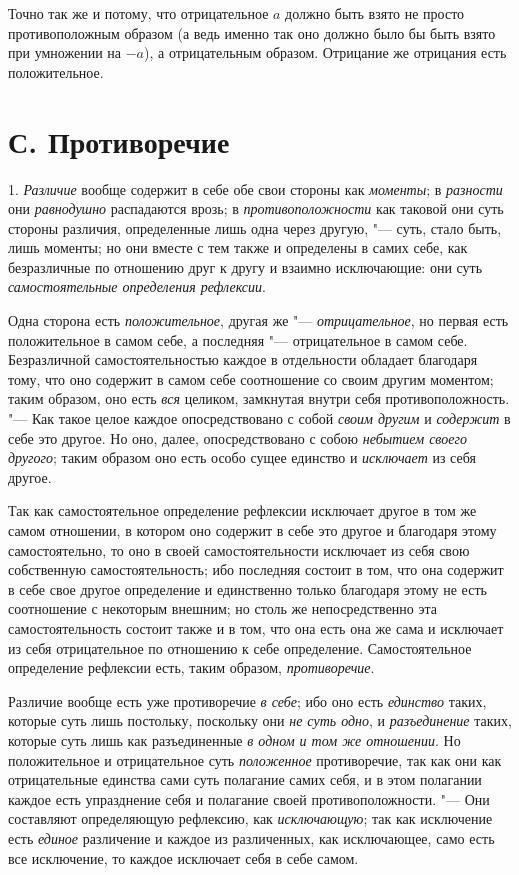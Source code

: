 Точно так же и потому, что отрицательное $a$ должно
быть взято не просто противоположным образом (а ведь именно так оно должно
было бы быть взято при умножении на $-a$), а
отрицательным образом. Отрицание же отрицания есть положительное.

\section[С. Противоречие]{С. Противоречие}
1. {\em Различие} вообще содержит в себе обе свои стороны
как {\em моменты}; в {\em разности} они {\em равнодушно}
распадаются врозь; в {\em противоположности} как
таковой они суть стороны различия, определенные лишь одна через другую, "---
суть, стало быть, лишь моменты; но они вместе с тем также и определены в
самих себе, как безразличные по отношению друг к другу и взаимно
исключающие: они суть {\em самостоятельные определения рефлексии}.

Одна сторона есть {\em положительное}, другая же
"--- {\em отрицательное}, но первая есть положительное в
самом себе, а последняя "--- отрицательное в самом себе. Безразличной
самостоятельностью каждое в отдельности обладает благодаря тому, что оно
содержит в самом себе соотношение со своим другим моментом; таким образом,
оно есть {\em вся} целиком, замкнутая внутри себя
противоположность. "--- Как такое целое каждое опосредствовано с собой
{\em своим другим} и {\em содержит}
в себе это другое. Но оно, далее, опосредствовано с собою
{\em небытием своего другого}; таким образом оно есть
особо сущее единство и {\em исключает} из себя другое.

Так как самостоятельное определение рефлексии исключает другое в том же
самом отношении, в котором оно содержит в себе это другое и благодаря этому
самостоятельно, то оно в своей самостоятельности исключает из себя свою
собственную самостоятельность; ибо последняя состоит в том, что она
содержит в себе свое другое определение и единственно только благодаря
этому не есть соотношение с некоторым внешним; но столь же непосредственно
эта самостоятельность состоит также и в том, что она есть она же сама и
исключает из себя отрицательное по отношению к себе определение.
Самостоятельное определение рефлексии есть, таким образом, {\em противоречие}.

Различие вообще есть уже противоречие {\em в себе}; ибо
оно есть {\em единство} таких, которые суть лишь
постольку, поскольку они {\em не суть одно}, и
{\em разъединение} таких, которые суть лишь как
разъединенные {\em в одном и том же отношении}. Но
положительное и отрицательное суть {\em положенное}
противоречие, так как они как отрицательные единства сами суть полагание
самих себя, и в этом полагании каждое есть упразднение себя и полагание
своей противоположности. "--- Они составляют определяющую рефлексию, как
{\em исключающую}; так как исключение есть
{\em единое} различение и каждое из различенных, как
исключающее, само есть все исключение, то каждое исключает себя в себе самом.

